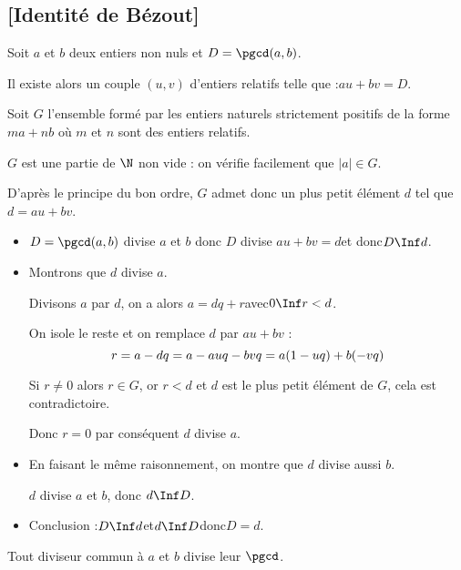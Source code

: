 \subsection{[Identité de Bézout]{}}
\begin{propriete}

Soit $a$ et $b$ deux entiers non nuls et $D=\pgcd(a,b)$.

Il existe alors un couple $(u,v)$ d'entiers relatifs telle que :\enskip $au+bv=D$.
\end{propriete}

\begin{preuve}

Soit $G$ l'ensemble formé par les entiers naturels strictement positifs de la forme $ma+nb$ où $m$ et $n$ sont des entiers relatifs.

$G$ est une partie de $\N$ non vide : on vérifie facilement que $\left|a\right|\in G$.\medskip

D'après le principe du bon ordre, $G$ admet donc un plus petit élément
$d$ tel que $d=au+bv$.
\begin{itemize}
\item $D=\pgcd(a,b)$ divise $a$ et $b$ donc $D$ divise\enskip
  $au+bv=d$\enskip et donc\enskip $D\Inf d$.\medskip

\item Montrons que $d$ divise $a$.

Divisons $a$ par $d$, on a alors $a=dq+r$\enskip avec\enskip $0\Inf r<d$.

On  isole le reste et on remplace $d$ par $au+bv$ :\vspace{-10pt}
$$r=a-dq=a-auq-bvq=a(1-uq)+b(-vq)\vspace{-10pt}$$

Si $r\neq0$ alors $r\in G$, or $r<d$ et $d$ est le plus petit élément de $G$, cela est contradictoire.

Donc $r=0$ par conséquent $d$ divise $a$.


\item En faisant le même raisonnement, on montre que $d$ divise aussi $b$.\medskip

$d$ divise $a$ et $b$, donc $d\Inf D$.

\item Conclusion :\enskip $D\Inf d$\enskip et\enskip $d\Inf D$\enskip donc\enskip $D=d$.
\end{itemize}
\end{preuve}

\begin{consequence} Tout diviseur commun à $a$ et $b$ divise leur
  $\pgcd$.
\end{consequence}


